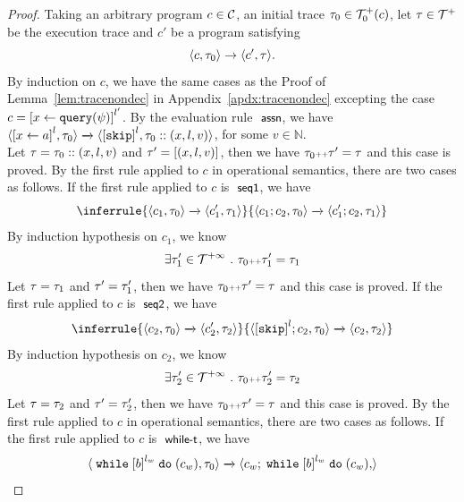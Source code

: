 \begin{proof}
  Taking an arbitrary program $c \in \mathcal{C}$, an initial trace $\mathtt{\tau}_0 \in \mathcal{T}^{+}_0(c)$, let
  $\mathtt{\tau} \in \mathcal{T}^{+}$ be the execution trace and $c'$ be a program satisfying
  \[
    \langle c, \mathtt{\tau}_0 \rangle \rightarrow \langle c', \mathtt{\tau} \rangle.
  \]
  By induction on $c$, we have the same cases as the Proof of Lemma~\ref{lem:tracenondec} in Appendix~\ref{apdx:tracenondec} excepting the case \textbf{$c = \clabel{\assign{x}{\query(\qexpr)}}^{l'}$}.
  By the evaluation rule $\textsf{\small{ assn}}$, we have
  $
  {
  \config{\clabel{\assign{{x}}{\aexpr}}^{l},  \trace_0 } 
  \xrightarrow{} 
  \config{\clabel{\eskip}^{l}, \trace_0 :: ({x}, l, v)}
  }$, for some $v \in \mathbb{N}$.
  \\
  Let $\mathtt{\tau} = \mathtt{\tau}_0 ::({x}, l, v)$ and $\mathtt{\tau}' =  [({x}, l, v) ]$,
  then we have $\mathtt{\tau}_0 {\scriptscriptstyle ++} \mathtt{\tau}' = \mathtt{\tau}$ and this case is proved.
  By the first rule applied to $c$ in operational semantics, there are two cases as follows.
  If the first rule applied to $c$ is $\textsf{\small{ seq1}}$, we have
  \[
    \inferrule
    {
    \config{{c_1, \trace_0}}
    \xrightarrow{}
    \config{{c_1',  \trace_1}}
    }
    {
    \config{{c_1; c_2, \trace_0}} 
    \xrightarrow{} 
    \config{{c_1'; c_2, \trace_1}}
    }
  \]
  By induction hypothesis on $c_1$, we know 
  \[
    \exists \mathtt{\tau}_1' \in \mathcal{T}^{+\infty} ~.~ \mathtt{\tau}_0 {\scriptscriptstyle ++} \mathtt{\tau}_1' = \mathtt{\tau}_1
  \]
  Let $\mathtt{\tau} = \mathtt{\tau}_1$ and $\mathtt{\tau}' =  \mathtt{\tau}_1'$,
  then we have $\mathtt{\tau}_0 {\scriptscriptstyle ++} \mathtt{\tau}' = \mathtt{\tau}$ and this case is proved.
  If the first rule applied to $c$ is $\textsf{\small{ seq2}}$, we have
  \[
    \inferrule
    {
    \config{{c_2, \trace_0}}
    \xrightarrow{}
    \config{{c_2',  \trace_2}}
    }
    {
    \config{{\clabel{\eskip}^l; c_2, \trace_0}} 
    \xrightarrow{} 
    \config{{c_2, \trace_2}}
    }
  \]
  By induction hypothesis on $c_2$, we know 
  \[
    \exists \mathtt{\tau}_2' \in \mathcal{T}^{+\infty} ~.~ \mathtt{\tau}_0 {\scriptscriptstyle ++} \mathtt{\tau}_2' = \mathtt{\tau}_2
  \]
  Let $\mathtt{\tau} = \mathtt{\tau}_2$ and $\mathtt{\tau}' =  \mathtt{\tau}_2'$,
  then we have $\mathtt{\tau}_0 {\scriptscriptstyle ++} \mathtt{\tau}' = \mathtt{\tau}$ and this case is proved.
  By the first rule applied to $c$ in operational semantics, there are two cases as follows.
  If the first rule applied to $c$ is $\textsf{\small{ while-t}}$, we have
  \[
    \config{{\ewhile \clabel{b}^{l_w} \edo (c_w), \trace_0}}
    \xrightarrow{} 
    \config{{
    c_w; \ewhile \clabel{b}^{l_w} \edo (c_w),
}}\]
\end{proof}
